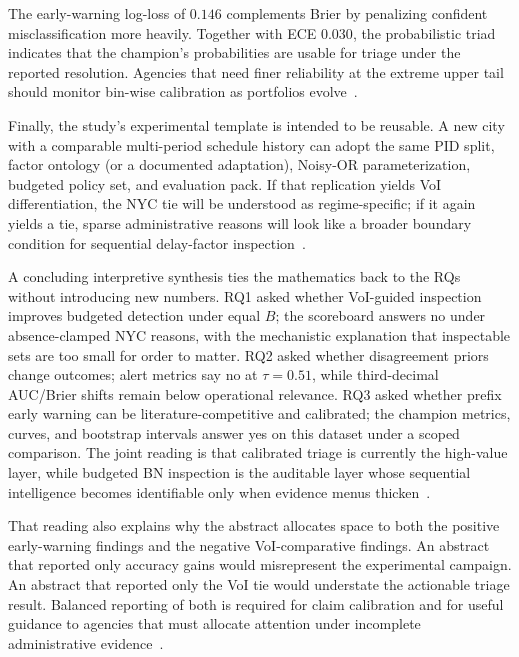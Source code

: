 The early-warning log-loss of $0.146$ complements Brier by penalizing confident misclassification more heavily. Together with ECE $0.030$, the probabilistic triad indicates that the champion's probabilities are usable for triage under the reported resolution. Agencies that need finer reliability at the extreme upper tail should monitor bin-wise calibration as portfolios evolve~\cite{GneitingRaftery2007,Vickers2006}.

Finally, the study's experimental template is intended to be reusable. A new city with a comparable multi-period schedule history can adopt the same PID split, factor ontology (or a documented adaptation), Noisy-OR parameterization, budgeted policy set, and evaluation pack. If that replication yields VoI differentiation, the NYC tie will be understood as regime-specific; if it again yields a tie, sparse administrative reasons will look like a broader boundary condition for sequential delay-factor inspection~\cite{Woldesenbet2016,Luu2009,Regona2024}.

A concluding interpretive synthesis ties the mathematics back to the RQs without introducing new numbers. RQ1 asked whether VoI-guided inspection improves budgeted detection under equal $B$; the scoreboard answers no under absence-clamped NYC reasons, with the mechanistic explanation that inspectable sets are too small for order to matter. RQ2 asked whether disagreement priors change outcomes; alert metrics say no at $\tau{=}0.51$, while third-decimal AUC/Brier shifts remain below operational relevance. RQ3 asked whether prefix early warning can be literature-competitive and calibrated; the champion metrics, curves, and bootstrap intervals answer yes on this dataset under a scoped comparison. The joint reading is that calibrated triage is currently the high-value layer, while budgeted BN inspection is the auditable layer whose sequential intelligence becomes identifiable only when evidence menus thicken~\cite{Howard1966,Luu2009,Egwim2021,Song2021,Gneiting2007,Tagharobi2025}.

That reading also explains why the abstract allocates space to both the positive early-warning findings and the negative VoI-comparative findings. An abstract that reported only accuracy gains would misrepresent the experimental campaign. An abstract that reported only the VoI tie would understate the actionable triage result. Balanced reporting of both is required for claim calibration and for useful guidance to agencies that must allocate attention under incomplete administrative evidence~\cite{Vickers2006,Memarzadeh2016,Regona2024}.
